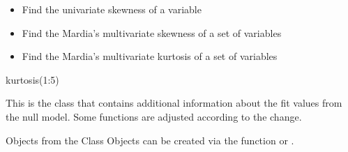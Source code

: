 \documentclass[a4paper]{book}
\begin{document}
%
\begin{SeeAlso}\relax
\begin{itemize}

\item {} Find the univariate skewness of a variable
\item {} Find the Mardia's multivariate skewness of a set of variables
\item {} Find the Mardia's multivariate kurtosis of a set of variables

\end{itemize}

\end{SeeAlso}
%
\begin{Examples}
\begin{ExampleCode}
kurtosis(1:5)
\end{ExampleCode}
\end{Examples}
%
\begin{Description}\relax
This is the  class that contains additional information about the fit values from the null model. Some functions are adjusted according to the change.
\end{Description}
%
\begin{Section}{Objects from the Class}
Objects can be created via the  function or .
\end{Section}
%
\end{document}
